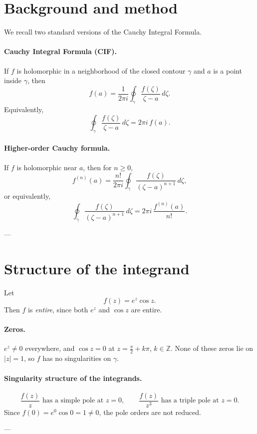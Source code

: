 \documentclass[11pt]{article}
\begin{document}
	\section*{Background and method}
	We recall two standard versions of the Cauchy Integral Formula.
	
	\paragraph{Cauchy Integral Formula (CIF).}
	If $f$ is holomorphic in a neighborhood of the closed contour $\gamma$ and $a$ is a point inside $\gamma$, then
	\[
	f(a)=\frac{1}{2\pi i}\oint_{\gamma}\frac{f(\zeta)}{\zeta-a}\,d\zeta.
	\]
	Equivalently,
	\[
	\oint_{\gamma}\frac{f(\zeta)}{\zeta-a}\,d\zeta = 2\pi i\,f(a).
	\]
	
	\paragraph{Higher-order Cauchy formula.}
	If $f$ is holomorphic near $a$, then for $n\ge0$,
	\[
	f^{(n)}(a)=\frac{n!}{2\pi i}\oint_{\gamma}\frac{f(\zeta)}{(\zeta-a)^{n+1}}\,d\zeta,
	\]
	or equivalently,
	\[
	\oint_{\gamma}\frac{f(\zeta)}{(\zeta-a)^{n+1}}\,d\zeta = 2\pi i\,\frac{f^{(n)}(a)}{n!}.
	\]
	
	---
	
	\section*{Structure of the integrand}
	
	Let
	\[
	f(z)=e^{z}\cos z.
	\]
	Then $f$ is \emph{entire}, since both $e^{z}$ and $\cos z$ are entire.
	
	\paragraph{Zeros.}
	$e^{z}\neq0$ everywhere, and $\cos z=0$ at $z=\frac{\pi}{2}+k\pi$, $k\in\mathbb{Z}$. 
	None of these zeros lie on $|z|=1$, so $f$ has no singularities on $\gamma$.
	
	\paragraph{Singularity structure of the integrands.}
	\[
	\frac{f(z)}{z} \text{ has a simple pole at } z=0, \qquad
	\frac{f(z)}{z^{3}} \text{ has a triple pole at } z=0.
	\]
	Since $f(0)=e^{0}\cos 0=1\neq0$, the pole orders are not reduced.
	
	---
	
\end{document}
